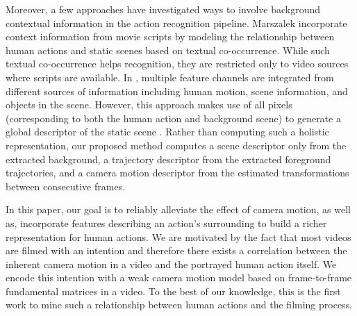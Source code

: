 Moreover, a few approaches have investigated ways to involve background contextual information in the action recognition pipeline. Marszalek \etal \cite{marszalek2009} incorporate context information from movie scripts by modeling the relationship between human actions and static scenes based on textual co-occurrence. While such textual co-occurrence helps recognition, they are restricted only to video sources where scripts are available. In \cite{ikizler2010}, multiple feature channels are integrated from different sources of information including human motion, scene information, and objects in the scene. However, this approach makes use of all pixels (corresponding to both the human action and background scene) to generate a global descriptor of the static scene \cite{oliva2001}. Rather than computing such a holistic representation, our proposed method computes a scene descriptor only from the extracted background, a trajectory descriptor from the extracted foreground trajectories, and a camera motion descriptor from the estimated transformations between consecutive frames.

In this paper, our goal is to reliably alleviate the effect of camera motion, as well as, incorporate features describing an action's surrounding to build a richer representation for human actions. We are motivated by the fact that most videos are filmed with an intention and therefore there exists a correlation between the inherent camera motion in a video and the portrayed human action itself. We encode this intention with a weak camera motion model based on frame-to-frame fundamental matrices in a video. To the best of our knowledge, this is the first work to mine such a relationship between human actions and the filming process.








